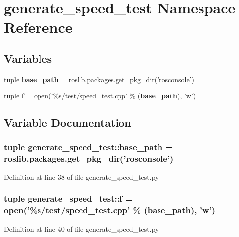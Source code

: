 \section{generate\_\-speed\_\-test Namespace Reference}
\label{namespacegenerate__speed__test}
\subsection*{Variables}
\begin{DoxyCompactItemize}
\item 
tuple {\bf base\_\-path} = roslib.packages.get\_\-pkg\_\-dir('rosconsole')
\item 
tuple {\bf f} = open('\%s/test/speed\_\-test.cpp' \% ({\bf base\_\-path}), 'w')
\end{DoxyCompactItemize}


\subsection{Variable Documentation}
\subsubsection[{base\_\-path}]{\setlength{\rightskip}{0pt plus 5cm}tuple {\bf generate\_\-speed\_\-test::base\_\-path} = roslib.packages.get\_\-pkg\_\-dir('rosconsole')}\label{namespacegenerate__speed__test_a25b2fec527e678ef9ae07eb764a971b1}


Definition at line 38 of file generate\_\-speed\_\-test.py.

\subsubsection[{f}]{\setlength{\rightskip}{0pt plus 5cm}tuple {\bf generate\_\-speed\_\-test::f} = open('\%s/test/speed\_\-test.cpp' \% ({\bf base\_\-path}), 'w')}\label{namespacegenerate__speed__test_a4e04d453eb416a354872cf4c94993d53}


Definition at line 40 of file generate\_\-speed\_\-test.py.

